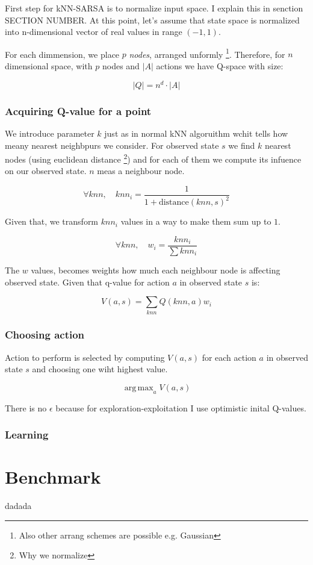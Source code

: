 \documentclass[12pt]{article}
\DeclareMathOperator*{\argmax}{arg\,max}
\begin{document}
First step for kNN-SARSA is to normalize input space. I explain this in senction SECTION NUMBER. At this point, let's assume that state space is normalized into n-dimensional vector of real values in range $(-1, 1)$.

For each dimmension, we place $p$ \emph{nodes}, arranged unformly \footnote{Also other arrang schemes are possible e.g. Gaussian}. Therefore, for $n$ dimensional space, with $p$ nodes and $|A|$ actions we have Q-space with size:

\begin{equation}
|Q| = n^d \cdot |A|
\end{equation}

\subsubsection{Acquiring Q-value for a point}

We introduce parameter $k$ just as in normal kNN algoruithm wchit tells how meany nearest neighbpurs we consider. For observed state $s$ we find $k$ nearest nodes (using euclidean distance \footnote{Why we normalize}) and for each of them we compute its infuence on our observed state. $n$ meas a neighbour node.

\begin{equation}
\forall knn, \quad knn_i = \frac{1}{1+\text{distance}(knn, s)^2}
\end{equation}

Given that, we transform $knn_i$ values in a way to make them sum up to $1$.

\begin{equation}
\forall knn, \quad w_i = \frac{knn_i}{\sum knn_i}
\end{equation}

The $w$ values, becomes weights how much each neighbour node is affecting observed state. Given that q-value for action $a$ in observed state $s$ is:

\begin{equation}
V(a, s) = \sum_{knn} Q(knn, a)w_i
\end{equation}

\subsubsection{Choosing action}

Action to perform is selected by computing $V(a, s)$ for each action $a$ in observed state $s$ and choosing one wiht highest value.

\begin{equation}
\argmax_a V(a, s)
\end{equation}

There is no $\epsilon$ because for exploration-exploitation I use optimistic inital Q-values.

\subsubsection{Learning}

\section{Benchmark}
dadada
\end{document}

